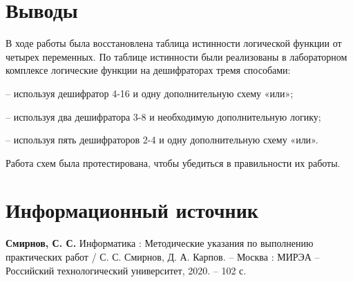 \documentclass[14pt, a4paper]{extreport}
\begin{document}
\chapter{Выводы}
В ходе работы была восстановлена таблица истинности логической функции от четырех переменных. По таблице истинности были реализованы в лабораторном комплексе логические функции на дешифраторах тремя способами:

– используя дешифратор 4-16 и одну дополнительную схему «или»;

– используя два дешифратора 3-8 и необходимую дополнительную логику;

– используя пять дешифраторов 2-4 и одну дополнительную схему «или».

Работа схем была протестирована, чтобы убедиться в правильности их работы.

\chapter{Информационный источник}
\textbf{Смирнов, С. С.} Информатика : Методические указания по выполнению практических работ / С. С. Смирнов, Д. А. Карпов. -- Москва : МИРЭА -- Российский технологический университет, 2020. -- 102 с.
\end{document}
